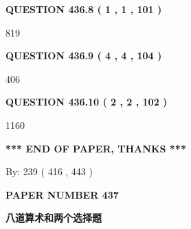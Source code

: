 \documentclass{ctexart}
\begin{document}
\vspace{0.2in}
  
{\textbf{\Large{QUESTION
436.8 
 ( 1 , 1 , 101 )
}}}
  
  
 
 
\noindent{}

819
 
 
  
\vspace{0.2in}
  
{\textbf{\Large{QUESTION
436.9 
 ( 4 , 4 , 104 )
}}}
  
  
 
 
\noindent{}

406
 
 
  
\vspace{0.2in}
  
{\textbf{\Large{QUESTION
436.10 
 ( 2 , 2 , 102 )
}}}
  
  
 
 
\noindent{}

1160
 
 
   
   
 \vspace{0.2in}
 
   
   
   
   
\vspace{1.0in} 
{\textbf{\large{ *** END OF PAPER, THANKS *** }}} 
   
   
\hspace{1.0in} By: 
 239 ( 416 ,  443 )
   
   
   
   
\newpage 
\setcounter{page}{ 
   437001 } 
   
   
   
   
 {\textbf{ \Large{ PAPER NUMBER  437  }}}
   
   
\vspace{0.2in}
   
   
   
   
   
   
 \vspace{0.2in}
{\LARGE {\textbf{ 八道算术和两个选择题}}}
   
\end{document}

